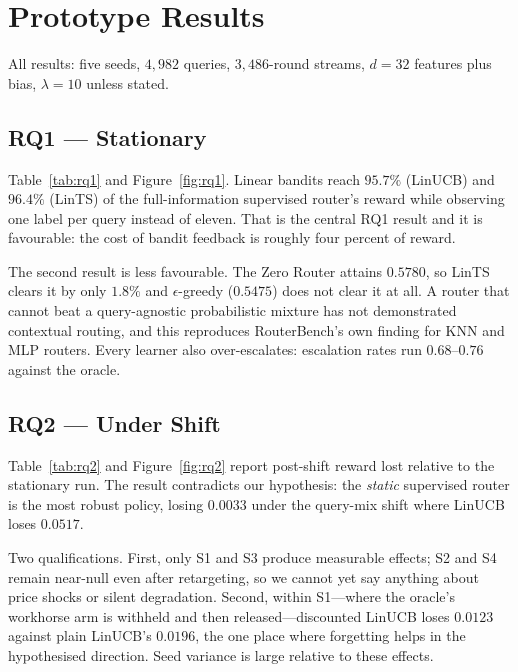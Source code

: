 \documentclass[10pt,twocolumn]{article}
\newcommand{\lam}{\lambda}
\begin{document}
\section{Prototype Results}

All results: five seeds, $4{,}982$ queries, $3{,}486$-round streams,
$d{=}32$ features plus bias, $\lam{=}10$ unless stated.

\subsection{RQ1 --- Stationary}

Table~\ref{tab:rq1} and Figure~\ref{fig:rq1}. Linear bandits reach
$95.7\%$ (LinUCB) and $96.4\%$ (LinTS) of the full-information supervised
router's reward while observing one label per query instead of eleven. That is
the central RQ1 result and it is favourable: the cost of bandit feedback is
roughly four percent of reward.

The second result is less favourable. The Zero Router attains $0.5780$, so
LinTS clears it by only $1.8\%$ and $\epsilon$-greedy ($0.5475$) does not clear
it at all. A router that cannot beat a query-agnostic probabilistic mixture has
not demonstrated contextual routing, and this reproduces RouterBench's own
finding for KNN and MLP routers. Every learner also over-escalates: escalation
rates run $0.68$--$0.76$ against the oracle.

\begin{table}[t]
\centering\small

\caption{RQ1 at $\lam=10$, mean over five seeds. ``\% Sup.'' is reward relative
to the full-information supervised router. Linear bandits reach $96\%$ of it
from one label per query instead of eleven, but clear the Zero Router by only
$1.8\%$, and $\epsilon$-greedy does not clear it at all.}
\label{tab:rq1}
\end{table}

\subsection{RQ2 --- Under Shift}
\label{sec:rq2}

Table~\ref{tab:rq2} and Figure~\ref{fig:rq2} report post-shift reward lost
relative to the stationary run. The result contradicts our hypothesis: the
\emph{static} supervised router is the most robust policy, losing $0.0033$ under
the query-mix shift where LinUCB loses $0.0517$.

Two qualifications. First, only S1 and S3 produce measurable effects;
S2 and S4 remain near-null even after retargeting, so we cannot yet say anything
about price shocks or silent degradation. Second, within S1---where the oracle's
workhorse arm is withheld and then released---discounted LinUCB loses $0.0123$
against plain LinUCB's $0.0196$, the one place where forgetting helps in the
hypothesised direction. Seed variance is large relative to these effects.
\end{document}
